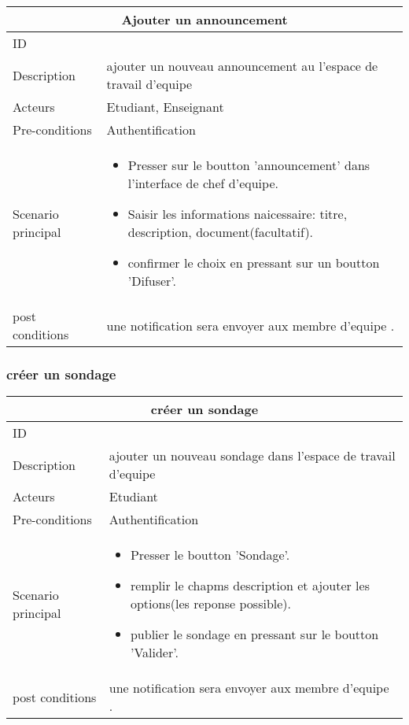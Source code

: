 \documentclass[11pt,fleqn]{book} %
\begin{document}
\begin{center}
\begin{tabularx}{1\textwidth} { | p{4cm} | >{\raggedright\arraybackslash}X |  }
  \hline
  \multicolumn{2}{|c|}{Ajouter un announcement} \\
 \hline
 ID & 3  \\
 \hline
 Description  &  ajouter un nouveau announcement au l'espace de travail d'equipe  \\
  \hline
 Acteurs  & Etudiant, Enseignant   \\
  \hline
 Pre-conditions  & Authentification\\
 \hline
 Scenario principal  &  
 \begin{itemize}
     \item Presser sur le boutton ’announcement’ dans l’interface de chef d’equipe.
     \item Saisir les informations naicessaire: titre, description, document(facultatif).
     \item confirmer le choix en pressant sur un boutton ’Difuser’.
 \end{itemize}\\
  \hline
 post conditions  & une notification sera envoyer aux membre d’equipe .  \\
  \hline
\end{tabularx}
\label{tbl:nicetablelesstable}
\end{center}
\subsubsection{créer un sondage}
\begin{center}
\begin{tabularx}{1\textwidth} { | p{4cm} | >{\raggedright\arraybackslash}X |  }
  \hline
  \multicolumn{2}{|c|}{créer un sondage} \\
 \hline
 ID & 4  \\
 \hline
 Description  &  ajouter un nouveau sondage dans l'espace de travail d'equipe  \\
  \hline
 Acteurs  & Etudiant   \\
  \hline
 Pre-conditions  & Authentification\\
 \hline
 Scenario principal  &  
 \begin{itemize}
     \item Presser le boutton ’Sondage’.
     \item remplir le chapms description et ajouter les options(les reponse possible).
     \item publier le sondage en pressant sur le boutton ’Valider’.
 \end{itemize}\\
  \hline
 post conditions  & une notification sera envoyer aux membre d’equipe . \\
  \hline
\end{tabularx}
\label{tbl:nicetablelesstable}
\end{center}
\end{document}
